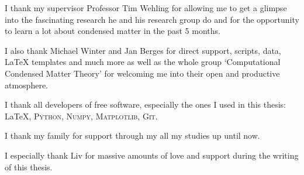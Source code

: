 \documentclass[../main.tex]{subfiles}
\begin{document}
I thank my supervisor Professor Tim Wehling for allowing me to get a glimpse into the fascinating research he and his research group do and for the opportunity to learn a lot about condensed matter in the past 5 months.

I also thank Michael Winter and Jan Berges for direct support, scripts, data, \LaTeX\xspace templates and much more as well as the whole group `Computational Condensed Matter Theory' for welcoming me into their open and  productive atmosphere.

I thank all developers of free software, especially the ones I used in this thesis: \LaTeX, \textsc{Python}, \textsc{Numpy}, \textsc{Matplotlib}, \textsc{Git}.

I thank my family for support through my all my studies up until now.

I especially thank Liv for massive amounts of love and support during the writing of this thesis.
\end{document}
